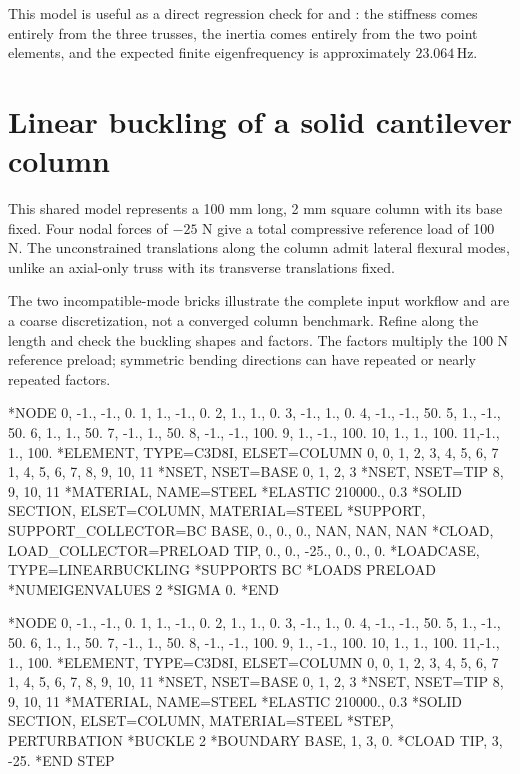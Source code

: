 This model is useful as a direct regression check for  and : the stiffness comes entirely from the three trusses, the inertia comes entirely from the two point elements, and the expected finite eigenfrequency is approximately \(23.064\,\mathrm{Hz}\).

\section{Linear buckling of a solid cantilever column}

This shared  model represents a 100 mm long, 2 mm square column with its base fixed. Four nodal forces of \(-25\) N give a total compressive reference load of 100 N. The unconstrained translations along the column admit lateral flexural modes, unlike an axial-only truss with its transverse translations fixed.

The two incompatible-mode bricks illustrate the complete input workflow and are a coarse discretization, not a converged column benchmark. Refine along the length and check the buckling shapes and factors. The factors multiply the 100 N reference preload; symmetric bending directions can have repeated or nearly repeated factors.

\begin{dialectexamples}
\begin{femasterdeck}
*NODE
0, -1., -1.,   0.
1,  1., -1.,   0.
2,  1.,  1.,   0.
3, -1.,  1.,   0.
4, -1., -1.,  50.
5,  1., -1.,  50.
6,  1.,  1.,  50.
7, -1.,  1.,  50.
8, -1., -1., 100.
9,  1., -1., 100.
10, 1.,  1., 100.
11,-1.,  1., 100.
*ELEMENT, TYPE=C3D8I, ELSET=COLUMN
0, 0, 1, 2, 3, 4, 5, 6, 7
1, 4, 5, 6, 7, 8, 9, 10, 11
*NSET, NSET=BASE
0, 1, 2, 3
*NSET, NSET=TIP
8, 9, 10, 11
*MATERIAL, NAME=STEEL
*ELASTIC
210000., 0.3
*SOLID SECTION, ELSET=COLUMN, MATERIAL=STEEL
*SUPPORT, SUPPORT_COLLECTOR=BC
BASE, 0., 0., 0., NAN, NAN, NAN
*CLOAD, LOAD_COLLECTOR=PRELOAD
TIP, 0., 0., -25., 0., 0., 0.
*LOADCASE, TYPE=LINEARBUCKLING
*SUPPORTS
BC
*LOADS
PRELOAD
*NUMEIGENVALUES
2
*SIGMA
0.
*END
\end{femasterdeck}
\begin{abaqusdeck}
*NODE
0, -1., -1.,   0.
1,  1., -1.,   0.
2,  1.,  1.,   0.
3, -1.,  1.,   0.
4, -1., -1.,  50.
5,  1., -1.,  50.
6,  1.,  1.,  50.
7, -1.,  1.,  50.
8, -1., -1., 100.
9,  1., -1., 100.
10, 1.,  1., 100.
11,-1.,  1., 100.
*ELEMENT, TYPE=C3D8I, ELSET=COLUMN
0, 0, 1, 2, 3, 4, 5, 6, 7
1, 4, 5, 6, 7, 8, 9, 10, 11
*NSET, NSET=BASE
0, 1, 2, 3
*NSET, NSET=TIP
8, 9, 10, 11
*MATERIAL, NAME=STEEL
*ELASTIC
210000., 0.3
*SOLID SECTION, ELSET=COLUMN, MATERIAL=STEEL
*STEP, PERTURBATION
*BUCKLE
2
*BOUNDARY
BASE, 1, 3, 0.
*CLOAD
TIP, 3, -25.
*END STEP
\end{abaqusdeck}
\end{dialectexamples}

